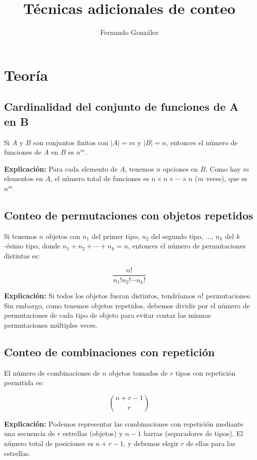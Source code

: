 \documentclass[letterpaper, 12pt]{article}
\title{Técnicas adicionales de conteo}
\author{Fernando González}
\date{}
\begin{document}
	
	\maketitle
	
	\section{Teoría}
	
	\subsection{Cardinalidad del conjunto de funciones de A en B}
	
	Si $A$ y $B$ son conjuntos finitos con $|A| = m$ y $|B| = n$, entonces el número de funciones de $A$ en $B$ es $n^m$.
	
	\textbf{Explicación:} Para cada elemento de $A$, tenemos $n$ opciones en $B$. Como hay $m$ elementos en $A$, el número total de funciones es $n \times n \times \cdots \times n$ ($m$ veces), que es $n^m$.
	
	\subsection{Conteo de permutaciones con objetos repetidos}
	
	Si tenemos $n$ objetos con $n_1$ del primer tipo, $n_2$ del segundo tipo, ..., $n_k$ del $k$-ésimo tipo, donde $n_1 + n_2 + \cdots + n_k = n$, entonces el número de permutaciones distintas es:
	
	$$\frac{n!}{n_1! n_2! \cdots n_k!}$$
	
	\textbf{Explicación:} Si todos los objetos fueran distintos, tendríamos $n!$ permutaciones. Sin embargo, como tenemos objetos repetidos, debemos dividir por el número de permutaciones de cada tipo de objeto para evitar contar las mismas permutaciones múltiples veces.
	
	\subsection{Conteo de combinaciones con repetición}
	
	El número de combinaciones de $n$ objetos tomados de $r$ tipos con repetición permitida es:
	
	$$\binom{n+r-1}{r}$$
	
	\textbf{Explicación:} Podemos representar las combinaciones con repetición mediante una secuencia de $r$ estrellas (objetos) y $n-1$ barras (separadores de tipos). El número total de posiciones es $n+r-1$, y debemos elegir $r$ de ellas para las estrellas.
	
\end{document}
